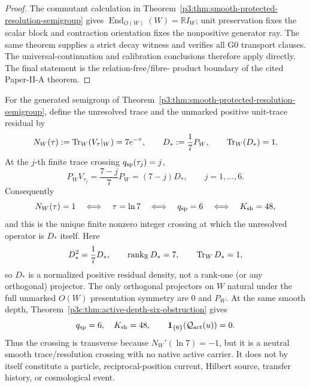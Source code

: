 \documentclass[12pt,a4paper]{article}
\begin{document}
\begin{proof}
The commutant calculation in
Theorem~\ref{p3:thm:smooth-protected-resolution-semigroup} gives
\(\operatorname{End}_{O(W)}(W)=\mathbb R I_W\); unit preservation fixes the
scalar block and contraction orientation fixes the nonpositive generator
ray.  The same theorem supplies a strict decay witness and verifies all G0
transport clauses.  The universal-continuation and calibration conclusions
therefore apply directly.  The final statement is the relation-free/fibre-
product boundary of the cited Paper-II-A theorem.
\end{proof}

\begin{corollary}
\label{p3c:cor:primitive-final-octet-residual}
For the generated semigroup of
Theorem~\ref{p3:thm:smooth-protected-resolution-semigroup}, define the
unresolved trace and the unmarked positive unit-trace residual by
\[
 N_W(\tau):=\operatorname{Tr}_W(V_\tau|_W)=7e^{-\tau},
 \qquad
 D_*:=\frac1{7}P_W,
 \qquad \operatorname{Tr}_W(D_*)=1.
\]
At the $j$-th finite trace crossing $q_{\rm sp}(\tau_j)=j$,
\begin{equation}
\label{p3c:eq:finite-crossing-residual-ladder}
 P_WV_{\tau_j}
 =\frac{7-j}{7}P_W
 =(7-j)D_*,
 \qquad j=1,\ldots,6.
\end{equation}
Consequently
\begin{equation}
\label{p3c:eq:primitive-k48-residual}
 N_W(\tau)=1
 \quad\Longleftrightarrow\quad
 \tau=\ln7
 \quad\Longleftrightarrow\quad
 q_{\rm sp}=6
 \quad\Longleftrightarrow\quad
 K_{\mathrm{sh}}=48,
\end{equation}
and this is the unique finite nonzero integer crossing at which the unresolved
operator is $D_*$ itself.  Here
\begin{equation}
 \label{p3c:eq:primitive-residual-not-projector}
 D_*^2=\frac17D_*,\qquad
 \operatorname{rank}_{\mathbb R}D_*=7,\qquad
 \operatorname{Tr}_WD_*=1,
\end{equation}
so \(D_*\) is a normalized positive residual density, not a rank-one (or any
orthogonal) projector.  The only orthogonal projectors on \(W\) natural under
the full unmarked \(O(W)\) presentation symmetry are \(0\) and \(P_W\).
At the same smooth depth, Theorem~\ref{p3c:thm:active-depth-six-obstruction}
gives
\begin{equation}
 \label{p3c:eq:k48-smooth-active-separation}
 q_{\rm sp}=6,\quad K_{\mathrm{sh}}=48,
 \qquad
 \mathbf1_{\{6\}}(\mathcal Q_{\rm act}(u))=0.
\end{equation}
Thus the crossing is transverse because \(N_W'(\ln7)=-1\), but it is a
neutral smooth trace/resolution crossing with no native active carrier.  It
does not by itself constitute a particle, reciprocal-position current,
Hilbert source, transfer history, or cosmological event.
\end{corollary}
\end{document}
